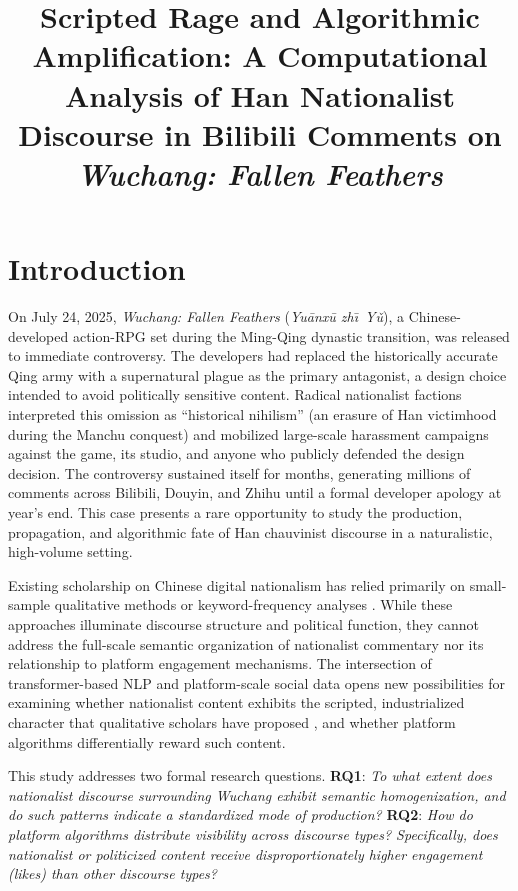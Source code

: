 \documentclass[man, 12pt, mask, floatsintext]{apa7}
\title{Scripted Rage and Algorithmic Amplification: A Computational Analysis of Han Nationalist Discourse in Bilibili Comments on \textit{Wuchang: Fallen Feathers}}
\begin{document}
\maketitle

\section{Introduction}

On July 24, 2025, \textit{Wuchang: Fallen Feathers} (\textit{Yu\={a}nx\={u} zh\=\i\ Y\v{u}}), a Chinese-developed action-RPG set during the Ming-Qing dynastic transition, was released to immediate controversy. The developers had replaced the historically accurate Qing army with a supernatural plague as the primary antagonist, a design choice intended to avoid politically sensitive content. Radical nationalist factions interpreted this omission as ``historical nihilism'' (an erasure of Han victimhood during the Manchu conquest) and mobilized large-scale harassment campaigns against the game, its studio, and anyone who publicly defended the design decision. The controversy sustained itself for months, generating millions of comments across Bilibili, Douyin, and Zhihu until a formal developer apology at year's end. This case presents a rare opportunity to study the production, propagation, and algorithmic fate of Han chauvinist discourse in a naturalistic, high-volume setting.

Existing scholarship on Chinese digital nationalism has relied primarily on small-sample qualitative methods or keyword-frequency analyses \parencite{schneider2018, repnikova2018}. While these approaches illuminate discourse structure and political function, they cannot address the full-scale semantic organization of nationalist commentary nor its relationship to platform engagement mechanisms. The intersection of transformer-based NLP and platform-scale social data opens new possibilities for examining whether nationalist content exhibits the scripted, industrialized character that qualitative scholars have proposed \parencite{schneider2018}, and whether platform algorithms differentially reward such content.

This study addresses two formal research questions. \textbf{RQ1}: \textit{To what extent does nationalist discourse surrounding Wuchang exhibit semantic homogenization, and do such patterns indicate a standardized mode of production?} \textbf{RQ2}: \textit{How do platform algorithms distribute visibility across discourse types? Specifically, does nationalist or politicized content receive disproportionately higher engagement (likes) than other discourse types?}
\end{document}
